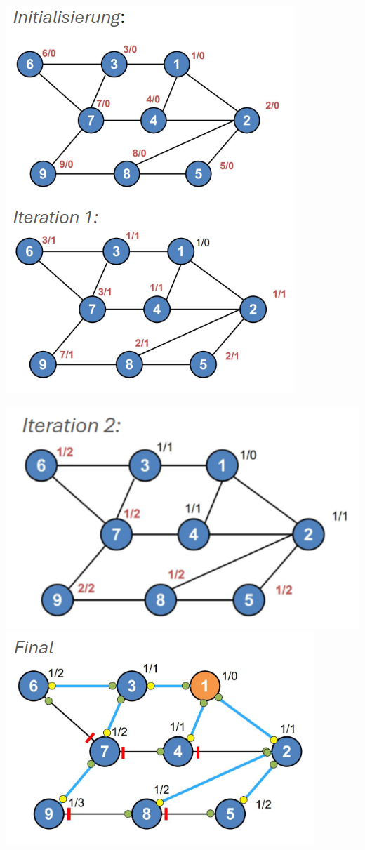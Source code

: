 \begin{example}
    \begin{minipage}{0.48\linewidth}
        \includegraphics[width=0.8\linewidth]{images/rapid_spanning_tree1.png}
    \end{minipage}
    \begin{minipage}{0.48\linewidth}
        \includegraphics[width=0.8\linewidth]{images/rapid_spanning_tree2.png}\\
        \includegraphics[width=0.8\linewidth]{images/rapid_spanning_tree3.png}
    \end{minipage}
\end{example}

